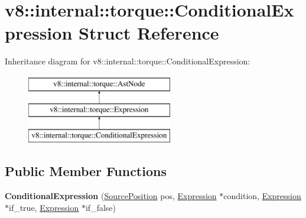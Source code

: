\hypertarget{structv8_1_1internal_1_1torque_1_1ConditionalExpression}{}\section{v8\+:\+:internal\+:\+:torque\+:\+:Conditional\+Expression Struct Reference}
\label{structv8_1_1internal_1_1torque_1_1ConditionalExpression}
Inheritance diagram for v8\+:\+:internal\+:\+:torque\+:\+:Conditional\+Expression\+:\begin{figure}[H]
\begin{center}
\leavevmode
\includegraphics[height=3.000000cm]{structv8_1_1internal_1_1torque_1_1ConditionalExpression}
\end{center}
\end{figure}
\subsection*{Public Member Functions}
\begin{DoxyCompactItemize}
\item 
\mbox{\label{structv8_1_1internal_1_1torque_1_1ConditionalExpression_a3b12cc37d53303a366a79fd8de3db35b}} 
{\bfseries Conditional\+Expression} (\mbox{\hyperlink{structv8_1_1internal_1_1torque_1_1SourcePosition}{Source\+Position}} pos, \mbox{\hyperlink{structv8_1_1internal_1_1torque_1_1Expression}{Expression}} $\ast$condition, \mbox{\hyperlink{structv8_1_1internal_1_1torque_1_1Expression}{Expression}} $\ast$if\+\_\+true, \mbox{\hyperlink{structv8_1_1internal_1_1torque_1_1Expression}{Expression}} $\ast$if\+\_\+false)
\end{DoxyCompactItemize}
